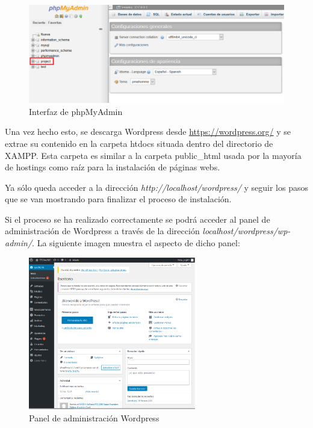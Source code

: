\begin{figure}[ht]
	\begin{center}
		\includegraphics[width=15.93cm, height=6.14 cm, ]{Figuras/phpmyadmin.png}
	\end{center}
	\caption{\label{fig:phpmyadmin} Interfaz de phpMyAdmin}
\end{figure}
\newpage

Una vez hecho esto, se descarga Wordpress desde \url{https://wordpress.org/} y se extrae su contenido en la carpeta htdocs situada dentro del directorio de XAMPP. Esta carpeta es similar a la carpeta public\_html usada por la mayoría de hostings como raíz para la instalación de páginas webs.

Ya sólo queda acceder a la dirección \textit{http://localhost/wordpress/} y seguir los pasos que se van mostrando para finalizar el proceso de instalación.

Si el proceso se ha realizado correctamente se podrá acceder al panel de administración de Wordpress a través de la dirección \textit{localhost/wordpress/wp-admin/}. La siguiente imagen muestra el aspecto de dicho panel:

\begin{figure}[ht]
	\begin{center}
		\includegraphics[width = 0.65\textwidth]{Figuras/wpadmin.PNG}
	\end{center}
	\caption{\label{fig:wordpressAdmin} Panel de administración Wordpress}
\end{figure}
\newpage


